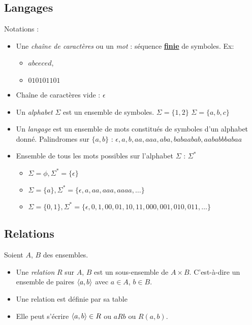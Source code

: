 \subsection{Langages}
\label{subsec:Langages}
Notations :
\begin{itemize}
    \item Une \emph{chaîne de caractères} ou un \emph{mot} : séquence \textbf{\underline{finie}} de symboles. Ex:
    	\begin{itemize}
    		\item $abceced$,
    		\item $010101101$
    	\end{itemize}
	\item Chaîne de caractères vide : $\epsilon$
    \item Un \emph{alphabet} $\Sigma$ est un ensemble de symboles. $\Sigma = \{1, 2\}$ $\Sigma = \{a, b, c\}$
    \item Un \emph{langage} est un ensemble de mots constitués de symboles d'un alphabet donné.
    	\subitem Palindromes sur $\{a, b\}$ : $\epsilon, a, b, aa, aaa, aba, babaabab, aababbbabaa$
	\item Ensemble de tous les mots possibles sur l'alphabet $\Sigma$ : $\Sigma ^*$
		\begin{itemize}
			\item $\Sigma = \phi, \Sigma^* = \{\epsilon\}$
			\item $\Sigma = \{a\}, \Sigma^* = \{\epsilon, a,aa,aaa,aaaa, \ldots\}$
			\item $\Sigma = \{0,1\}, \Sigma^* = \{\epsilon, 0,1,00,01,10,11,000,001,010,011, \ldots\}$
		\end{itemize}
\end{itemize}


\subsection{Relations}
\label{subsec:relations}
Soient $A$, $B$ des ensembles.
\begin{itemize}
	\item Une \emph{relation} $R$ sur $A$, $B$ est un sous-ensemble de $A \times B$. C'est-à-dire
		un ensemble de paires $\langle a,b \rangle$ avec $a\in A$, $b\in B$.
	\item Une relation est définie par sa table
	\item Elle peut s'écrire $\langle a,b \rangle \in R$ ou $aR b$ ou $R(a,b)$.
\end{itemize}

